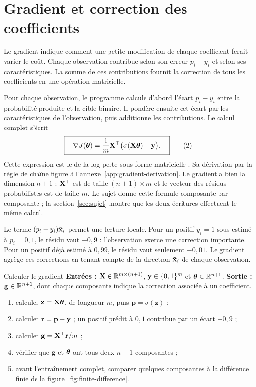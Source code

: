 \section{Gradient et correction des coefficients}

\begin{lecture}
Le gradient indique comment une petite modification de chaque coefficient ferait
varier le coût. Chaque observation contribue selon son erreur $p_i-y_i$ et selon
ses caractéristiques. La somme de ces contributions fournit la correction de
tous les coefficients en une opération matricielle.
\end{lecture}

Pour chaque observation, le programme calcule d'abord l'écart $p_i-y_i$ entre
la probabilité produite et la cible binaire. Il pondère ensuite cet écart par les
caractéristiques de l'observation, puis additionne les contributions. Le calcul
complet s'écrit
\[
  \boxed{\quad\nabla J(\boldsymbol{\theta})=\frac1m\mathbf{X}^\top
  \bigl(\sigma(\mathbf{X}\boldsymbol{\theta})-\mathbf{y}\bigr).\quad}
  \tag{2}\label{eq:gradient}
\]
Cette expression est le  de la log-perte sous forme matricielle
\cite[équation~4.21]{hastie2009}.
Sa dérivation par la règle de chaîne figure à
l'annexe~\ref{app:gradient-derivation}.
Le gradient a bien la dimension $n+1$ : $\mathbf{X}^\top$ est de taille
$(n+1)\times m$ et le vecteur des résidus probabilistes est de taille $m$. Le
sujet donne cette formule composante par composante ; la
section~\ref{sec:sujet} montre que les deux écritures effectuent le même calcul.

Le terme $(p_i-y_i)\tilde{\mathbf{x}}_i$ permet une lecture locale. Pour un positif
$y_i=1$ sous-estimé à $p_i=0{,}1$, le résidu vaut $-0{,}9$ : l'observation exerce
une correction importante. Pour un positif déjà estimé à $0{,}99$, le résidu
vaut seulement $-0{,}01$. Le gradient agrège ces corrections en tenant compte de
la direction $\tilde{\mathbf{x}}_i$ de chaque observation.

\begin{procedure}{Calculer le gradient}
\textbf{Entrées :} $\mathbf{X}\in\mathbb{R}^{m\times(n+1)}$, $\mathbf{y}\in\{0,1\}^m$ et
$\boldsymbol{\theta}\in\mathbb{R}^{n+1}$. \textbf{Sortie :} $\mathbf g\in\mathbb{R}^{n+1}$, dont chaque
composante indique la correction associée à un coefficient.
\begin{enumerate}
  \item calculer $\mathbf z=\mathbf{X}\boldsymbol{\theta}$, de longueur $m$, puis
        $\mathbf p=\sigma(\mathbf z)$ ;
  \item calculer $\mathbf r=\mathbf p-\mathbf{y}$ ; un positif prédit à $0{,}1$ contribue
        par un écart $-0{,}9$ ;
  \item calculer $\mathbf g=\mathbf{X}^\top\mathbf r/m$ ;
  \item vérifier que $\mathbf g$ et $\boldsymbol{\theta}$ ont tous deux $n+1$ composantes ;
  \item avant l'entraînement complet, comparer quelques composantes à la
        différence finie de la figure~\ref{fig:finite-difference}.
\end{enumerate}
\end{procedure}

